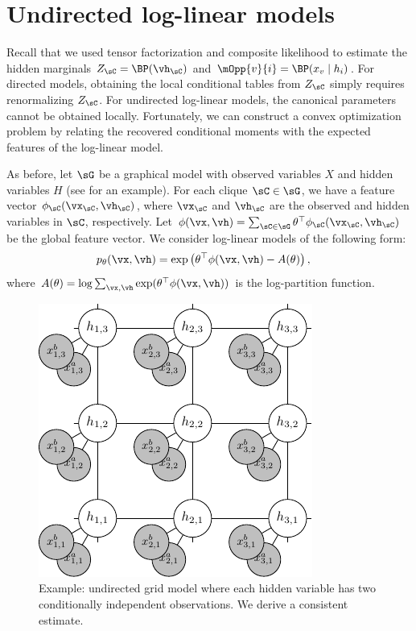 \section{Undirected log-linear models}
\label{sec:undirected}

Recall that we used tensor factorization and composite likelihood
to estimate the hidden marginals $Z_\sC = \BP(\vh_\sC)$ and $\mOpp{v}{i} = \BP(x_v \mid h_i)$.
For directed models, obtaining the local conditional tables from $Z_\sC$ simply requires
renormalizing $Z_\sC$.
For undirected log-linear models, the canonical parameters cannot be obtained
locally.
Fortunately, we can construct a convex optimization problem
by relating the recovered conditional moments with the expected features of
the log-linear model.

As before, let $\sG$ be a graphical model with observed variables $X$ and hidden variables $H$
(see  for an example).
For each clique $\sC \in \sG$, we have a feature vector $\phi_\sC(\vx_\sC, \vh_\sC)$,
where $\vx_\sC$ and $\vh_\sC$ are the observed and hidden variables in $\sC$, respectively.
Let $\phi(\vx, \vh) = \sum_{\sC \in \sG} \theta^\top \phi_\sC(\vx_\sC,\vh_\sC)$ be the global feature vector.
We consider log-linear models of the following form:
\begin{align}
p_\theta(\vx, \vh) &= \exp\left( \theta^\top \phi(\vx,\vh) - A(\theta) \right),
\end{align}
where $A(\theta) = \log \sum_{\vx, \vh}  \exp( \theta^\top \phi(\vx,\vh) )$ is the log-partition function.

\begin{figure}
  \centering
  \includegraphics[width=0.6\columnwidth]{figures/mrf.pdf}
  \caption{Example: undirected grid model where each hidden variable has two
  conditionally independent observations.
  We derive a consistent estimate.}
  \label{fig:examples-mrf}
\end{figure}

